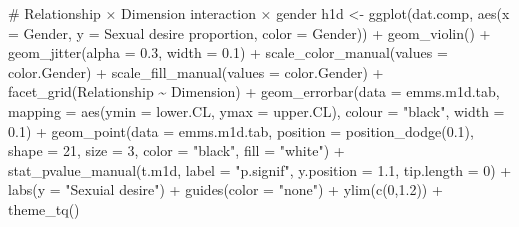 \documentclass[
  bookmarksnumbered]{article}
\newenvironment{Shaded}{\begin{snugshade}}{\end{snugshade}}
\newcommand{\AttributeTok}[1]{\textcolor[rgb]{0.80,0.80,0.80}{#1}}
\newcommand{\CommentTok}[1]{\textcolor[rgb]{0.50,0.62,0.50}{#1}}
\newcommand{\DecValTok}[1]{\textcolor[rgb]{0.86,0.86,0.80}{#1}}
\newcommand{\FloatTok}[1]{\textcolor[rgb]{0.75,0.75,0.82}{#1}}
\newcommand{\FunctionTok}[1]{\textcolor[rgb]{0.94,0.94,0.56}{#1}}
\newcommand{\NormalTok}[1]{\textcolor[rgb]{0.80,0.80,0.80}{#1}}
\newcommand{\OtherTok}[1]{\textcolor[rgb]{0.94,0.94,0.56}{#1}}
\newcommand{\SpecialCharTok}[1]{\textcolor[rgb]{0.86,0.64,0.64}{#1}}
\newcommand{\StringTok}[1]{\textcolor[rgb]{0.80,0.58,0.58}{#1}}
\begin{document}
\begin{Shaded}
\begin{Highlighting}[]
\CommentTok{\# Relationship × Dimension interaction  × gender}
\NormalTok{h1d }\OtherTok{\textless{}{-}} \FunctionTok{ggplot}\NormalTok{(dat.comp, }\FunctionTok{aes}\NormalTok{(}\AttributeTok{x =}\NormalTok{ Gender, }\AttributeTok{y =} \StringTok{\textasciigrave{}}\AttributeTok{Sexual desire proportion}\StringTok{\textasciigrave{}}\NormalTok{, }\AttributeTok{color =}\NormalTok{ Gender)) }\SpecialCharTok{+}
  \FunctionTok{geom\_violin}\NormalTok{() }\SpecialCharTok{+}
  \FunctionTok{geom\_jitter}\NormalTok{(}\AttributeTok{alpha =} \FloatTok{0.3}\NormalTok{, }\AttributeTok{width =} \FloatTok{0.1}\NormalTok{) }\SpecialCharTok{+}
  \FunctionTok{scale\_color\_manual}\NormalTok{(}\AttributeTok{values =}\NormalTok{ color.Gender) }\SpecialCharTok{+}
  \FunctionTok{scale\_fill\_manual}\NormalTok{(}\AttributeTok{values =}\NormalTok{ color.Gender) }\SpecialCharTok{+}
  \FunctionTok{facet\_grid}\NormalTok{(Relationship }\SpecialCharTok{\textasciitilde{}}\NormalTok{ Dimension) }\SpecialCharTok{+}
  \FunctionTok{geom\_errorbar}\NormalTok{(}\AttributeTok{data =}\NormalTok{ emms.m1d.tab, }
                \AttributeTok{mapping =} \FunctionTok{aes}\NormalTok{(}\AttributeTok{ymin =}\NormalTok{ lower.CL, }\AttributeTok{ymax =}\NormalTok{ upper.CL), }
                \AttributeTok{colour =} \StringTok{"black"}\NormalTok{, }\AttributeTok{width =} \FloatTok{0.1}\NormalTok{) }\SpecialCharTok{+}
  \FunctionTok{geom\_point}\NormalTok{(}\AttributeTok{data =}\NormalTok{ emms.m1d.tab, }
             \AttributeTok{position =} \FunctionTok{position\_dodge}\NormalTok{(}\FloatTok{0.1}\NormalTok{), }
             \AttributeTok{shape =} \DecValTok{21}\NormalTok{, }\AttributeTok{size =} \DecValTok{3}\NormalTok{,}
             \AttributeTok{color =} \StringTok{"black"}\NormalTok{, }\AttributeTok{fill =} \StringTok{"white"}\NormalTok{) }\SpecialCharTok{+}
  \FunctionTok{stat\_pvalue\_manual}\NormalTok{(t.m1d, }
                     \AttributeTok{label =} \StringTok{"p.signif"}\NormalTok{, }
                     \AttributeTok{y.position =} \FloatTok{1.1}\NormalTok{, }
                     \AttributeTok{tip.length =} \DecValTok{0}\NormalTok{) }\SpecialCharTok{+}
  \FunctionTok{labs}\NormalTok{(}\AttributeTok{y =} \StringTok{"Sexuial desire"}\NormalTok{) }\SpecialCharTok{+}
  \FunctionTok{guides}\NormalTok{(}\AttributeTok{color =} \StringTok{"none"}\NormalTok{) }\SpecialCharTok{+}
  \FunctionTok{ylim}\NormalTok{(}\FunctionTok{c}\NormalTok{(}\DecValTok{0}\NormalTok{,}\FloatTok{1.2}\NormalTok{)) }\SpecialCharTok{+}
  \FunctionTok{theme\_tq}\NormalTok{()}



\end{Highlighting}
\end{Shaded}
\end{document}
